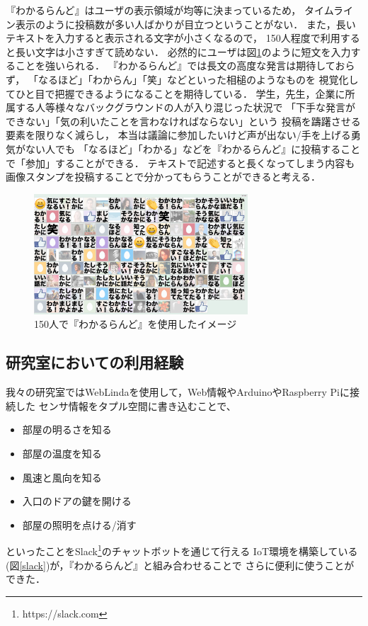 『わかるらんど』はユーザの表示領域が均等に決まっているため，
タイムライン表示のように投稿数が多い人ばかりが目立つということがない．
また，長いテキストを入力すると表示される文字が小さくなるので，
150人程度で利用すると長い文字は小さすぎて読めない．
必然的にユーザは図\ref{wakaruland150}のように短文を入力することを強いられる．
『わかるらんど』では長文の高度な発言は期待しておらず，
「なるほど」「わからん」「笑」などといった相槌のようなものを
視覚化してひと目で把握できるようになることを期待している．
学生，先生，企業に所属する人等様々なバックグラウンドの人が入り混じった状況で
「下手な発言ができない」「気の利いたことを言わなければならない」という
投稿を躊躇させる要素を限りなく減らし，
本当は議論に参加したいけど声が出ない/手を上げる勇気がない人でも
「なるほど」「わかる」などを『わかるらんど』に投稿することで「参加」することができる．
テキストで記述すると長くなってしまう内容も
画像スタンプを投稿することで分かってもらうことができると考える．


\begin{figure}[h]
\centering
\includegraphics[width=8cm]{images/wakaruland150.png}
\caption{150人で『わかるらんど』を使用したイメージ}
\label{wakaruland150}
\end{figure}

\subsection{研究室においての利用経験}
我々の研究室ではWebLindaを使用して，Web情報やArduinoやRaspberry Piに接続した
センサ情報をタプル空間に書き込むことで、
\begin{itemize}
\item 部屋の明るさを知る
\item 部屋の温度を知る
\item 風速と風向を知る
\item 入口のドアの鍵を開ける
\item 部屋の照明を点ける/消す
\end{itemize}
といったことをSlack\footnote{https://slack.com}のチャットボットを通じて行える
IoT環境を構築している(図\ref{slack})が，『わかるらんど』と組み合わせることで
さらに便利に使うことができた．

